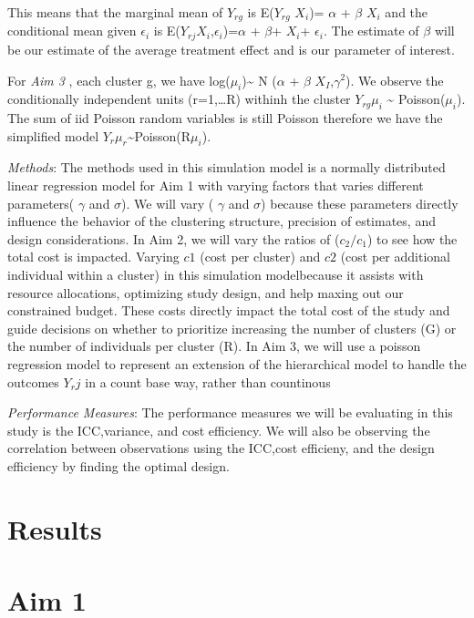 \documentclass[
]{article}
\begin{document}
This means that the marginal mean of \(Y_{rg}\) is
E(\(Y_{rg}\)\textbar{} \(X_{i}\))= \(\alpha\) + \(\beta\) \(X_{i}\) and
the conditional mean given \(\epsilon_{i}\) is
E(\(Y_{rj}\)\textbar{}\(X_i\),\(\epsilon_{i}\))=\(\alpha\) + \(\beta\)+
\(X_{i}\)+ \(\epsilon_{i}\). The estimate of \(\beta\) will be our
estimate of the average treatment effect and is our parameter of
interest.

For \emph{Aim 3} , each cluster g, we have
log(\(\mu_{i}\))\textasciitilde{} N (\(\alpha\) + \(\beta\)
\(X_I\),\(\gamma^2\)). We observe the conditionally independent units
(r=1,\ldots R) withinh the cluster \(Y_{rg}\)\textbar{}\(\mu_i\)
\textasciitilde{} Poisson(\(\mu_i\)). The sum of iid Poisson random
variables is still Poisson therefore we have the simplified model
\(Y_r\)\textbar{}\(\mu_r\)\textasciitilde Poisson(R\(\mu_i\)).

\emph{Methods}: The methods used in this simulation model is a normally
distributed linear regression model for Aim 1 with varying factors that
varies different parameters( \(\gamma\) and \(\sigma\)). We will vary (
\(\gamma\) and \(\sigma\)) because these parameters directly influence
the behavior of the clustering structure, precision of estimates, and
design considerations. In Aim 2, we will vary the ratios of
(\(c_2 /c_1\)) to see how the total cost is impacted. Varying \(c1\)
(cost per cluster) and \(c2\) (cost per additional individual within a
cluster) in this simulation modelbecause it assists with resource
allocations, optimizing study design, and help maxing out our
constrained budget. These costs directly impact the total cost of the
study and guide decisions on whether to prioritize increasing the number
of clusters (G) or the number of individuals per cluster (R). In Aim 3,
we will use a poisson regression model to represent an extension of the
hierarchical model to handle the outcomes \(Y_rj\) in a count base way,
rather than countinous

\emph{Performance Measures}: The performance measures we will be
evaluating in this study is the ICC,variance, and cost efficiency. We
will also be observing the correlation between observations using the
ICC,cost efficieny, and the design efficiency by finding the optimal
design.

\hypertarget{results}{%
\section{Results}\label{results}}

\hypertarget{aim-1}{%
\section{Aim 1}\label{aim-1}}
\end{document}
